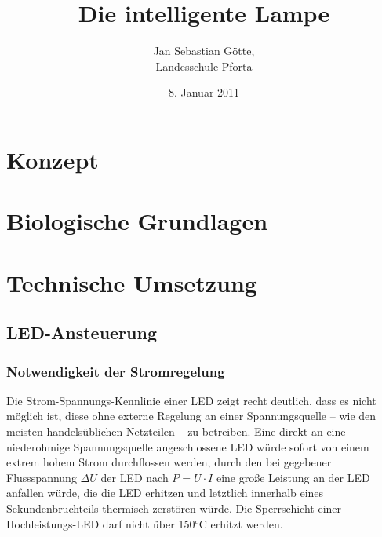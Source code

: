 \documentclass[12pt,a4paper,notitlepage]{article}
\date{8. Januar 2011}
\author{Jan Sebastian Götte,\\Landesschule Pforta}
\title{Die intelligente Lampe}
\begin{document}
\maketitle
\thispagestyle{empty}
\newpage
{}
\tableofcontents
\newpage
\section{Konzept}
\section{Biologische Grundlagen}
\section{Technische Umsetzung}
\subsection{LED-Ansteuerung}
\subsubsection{Notwendigkeit der Stromregelung}
Die Strom-Spannungs-Kennlinie einer \gls{LED} zeigt recht deutlich, dass es nicht möglich ist, diese ohne externe Regelung an einer Spannungsquelle -- wie den meisten handelsüblichen Netzteilen -- zu betreiben. Eine direkt an eine niederohmige Spannungsquelle angeschlossene \gls{LED} würde sofort von einem extrem hohem Strom durchflossen werden, durch den bei gegebener \gls{Flussspannung} $\Delta U$ der \gls{LED} nach $P=U\cdot I$ eine große Leistung an der \gls{LED} anfallen würde, die die \gls{LED} erhitzen und letztlich innerhalb eines Sekundenbruchteils thermisch zerstören würde. Die \gls{Sperrschicht} einer Hochleistungs-\gls{LED} darf nicht über 150°C erhitzt werden\cite{PHILIPS1,PHILIPS2}.
\end{document}
